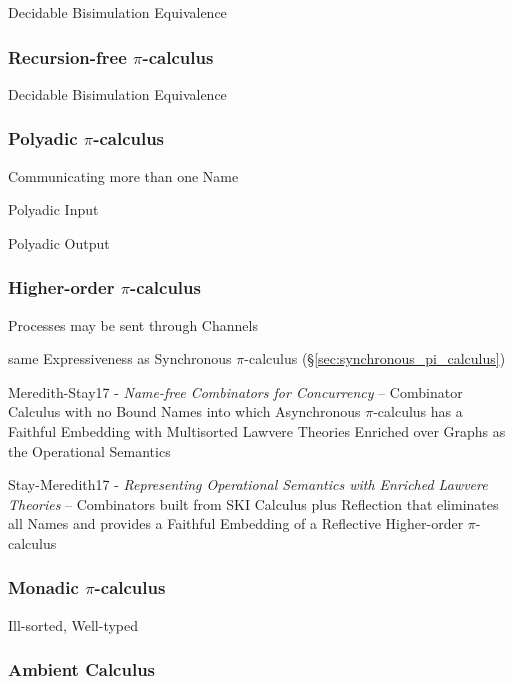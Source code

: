 Decidable Bisimulation Equivalence



\subsubsection{Recursion-free $\pi$-calculus}
\label{sec:recursionfree_pi_calculus}

Decidable Bisimulation Equivalence



\subsubsection{Polyadic $\pi$-calculus}\label{sec:polyadic_pi_calculus}

Communicating more than one Name

Polyadic Input

Polyadic Output



\subsubsection{Higher-order $\pi$-calculus}
\label{sec:higherorder_pi_calculus}

Processes may be sent through Channels

same Expressiveness as Synchronous $\pi$-calculus
(\S\ref{sec:synchronous_pi_calculus})

Meredith-Stay17 - \emph{Name-free Combinators for Concurrency} --
Combinator Calculus with no Bound Names into which Asynchronous
$\pi$-calculus has a Faithful Embedding with Multisorted Lawvere
Theories Enriched over Graphs as the Operational Semantics

Stay-Meredith17 - \emph{Representing Operational Semantics with
  Enriched Lawvere Theories} -- Combinators built from SKI Calculus
plus Reflection that eliminates all Names and provides a Faithful
Embedding of a Reflective Higher-order $\pi$-calculus



\subsubsection{Monadic $\pi$-calculus}\label{sec:monadic_pi_calculus}

Ill-sorted, Well-typed %



\subsubsection{Ambient Calculus}\label{sec:ambient_calculus}

